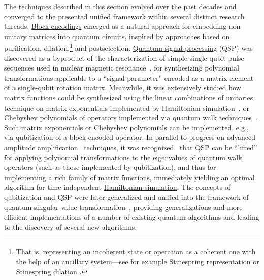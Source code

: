 \begin{refsection}
The techniques described in this section evolved over the past decades and converged to the presented unified framework within several distinct research threads. \hyperref[prim:BlockEncodings]{Block-encodings} emerged as a natural approach for embedding non-unitary matrices into quantum circuits, inspired by approaches based on purification, dilation,\footnote{That is, representing an incoherent state or operation as a coherent one with the help of an ancillary system---see for example Stinespring representation \cite{wolf2012QChannelsOpsLectureNotes} or Stinespring dilation \cite{wilde2017QIT}.} and postselection. \hyperref[prim:QSP]{Quantum signal processing} (QSP) was discovered as a byproduct of the characterization of simple single-qubit pulse sequences used in nuclear magnetic resonance~\cite{low2016CompositeQuantGates}, for synthesizing polynomial transformations applicable to a ``signal parameter'' encoded as a matrix element of a single-qubit rotation matrix. Meanwhile, it was extensively studied how matrix functions could be synthesized using the \hyperref[prim:LCU]{linear combinations of unitaries} technique on matrix exponentials implemented by Hamiltonian simulation~\cite{childs2012HamSimLCU,apeldoorn2017QSDPSolvers,chakraborty2018BlockMatrixPowers}, or Chebyshev polynomials of operators implemented via quantum walk techniques~\cite{berry2013ExpPrecHamSimSTOC,berry2015HamSimNearlyOpt,childs2015QLinSysExpPrec}. Such matrix exponentials or Chebyshev polynomials can be implemented, e.g., via \hyperref[prim:Qubitization]{qubitization} of a block-encoded operator. In parallel to progress on advanced \hyperref[prim:AmpAmp]{amplitude amplification}~\cite{grover2005FixedPointSearch, yoder2014FixedPointSearch} techniques, it was recognized~\cite{low2016HamSimQSignProc,low2016HamSimQubitization} that QSP can be ``lifted'' for applying polynomial transformations to the eigenvalues of quantum walk operators (such as those implemented by qubitization), and thus for implementing a rich family of matrix functions, immediately yielding an optimal algorithm for time-independent \hyperref[prim:QSPqubitization]{Hamiltonian simulation}. The concepts of qubitization and QSP were later generalized and unified into the framework of \hyperref[prim:QSVT]{quantum singular value transformation}~\cite{gilyen2018QSingValTransf}, providing generalizations and more efficient implementations of a number of existing quantum algorithms and leading to the discovery of several new algorithms.  


\localtableofcontents
\printbibliography[heading=secbib,segment=\therefsegment]

\end{refsection}

